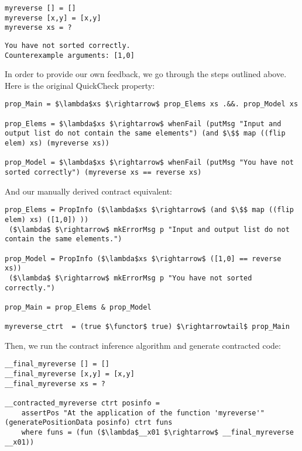 \documentclass[10pt]{report}
\makeatletter
\newcommand{\functor}{<\!\!\!@\!\!\!>}
\makeatother
\begin{document}
{\begin{lstlisting}[caption=Student input 1]
myreverse [] = []
myreverse [x,y] = [x,y]
myreverse xs = ?
\end{lstlisting}

\begin{lstlisting}[caption=Ask-Elle's response to input 1]
You have not sorted correctly.
Counterexample arguments: [1,0]
\end{lstlisting}

In order to provide our own feedback, we go through the steps outlined above.
Here is the original QuickCheck property:

\begin{lstlisting}[mathescape]
prop_Main = $\lambda$xs $\rightarrow$ prop_Elems xs .&&. prop_Model xs

prop_Elems = $\lambda$xs $\rightarrow$ whenFail (putMsg "Input and output list do not contain the same elements") (and $\$$ map ((flip elem) xs) (myreverse xs))

prop_Model = $\lambda$xs $\rightarrow$ whenFail (putMsg "You have not sorted correctly") (myreverse xs == reverse xs)
\end{lstlisting}

And our manually derived contract equivalent:

\begin{lstlisting}[mathescape]
prop_Elems = PropInfo ($\lambda$xs $\rightarrow$ (and $\$$ map ((flip elem) xs) ([1,0]) )) 
 ($\lambda$ $\rightarrow$ mkErrorMsg p "Input and output list do not contain the same elements.")
              
prop_Model = PropInfo ($\lambda$xs $\rightarrow$ ([1,0] == reverse xs)) 
 ($\lambda$ $\rightarrow$ mkErrorMsg p "You have not sorted correctly.")

prop_Main = prop_Elems & prop_Model

myreverse_ctrt  = (true $\functor$ true) $\rightarrowtail$ prop_Main
\end{lstlisting}

Then, we run the contract inference algorithm and generate contracted code:

\begin{lstlisting}[mathescape]
__final_myreverse [] = []
__final_myreverse [x,y] = [x,y]
__final_myreverse xs = ?

__contracted_myreverse ctrt posinfo =
    assertPos "At the application of the function 'myreverse'" (generatePositionData posinfo) ctrt funs
    where funs = (fun ($\lambda$__x01 $\rightarrow$ __final_myreverse __x01))
        

\end{lstlisting}}
\end{document}
